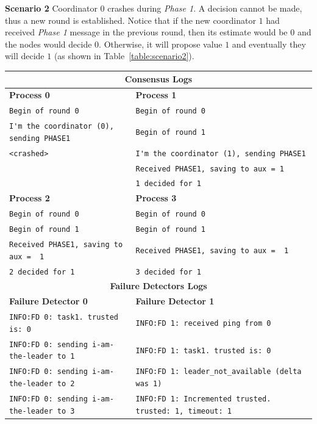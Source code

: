 \documentclass[a4paper]{article}
\begin{document}
\begin{compactitem}
\item \textbf{Scenario 2} Coordinator $0$ crashes during \emph{Phase 1}. A decision cannot be made, thus a new round is established. Notice that if the new coordinator $1$ had received \emph{Phase 1} message in the previous round, then its estimate would be $0$ and the nodes would decide $0$. Otherwise, it will propose value $1$ and eventually they will decide $1$ (as shown in Table~\ref{table:scenario2}).
	\begin{table}[H]
		\centering\scriptsize
        \begin{tabular}{ll}
		\toprule
        \multicolumn{2}{c}{\textbf{Consensus Logs}} \\
        \midrule
		\textbf{Process 0} & \textbf{Process 1} \\
		\midrule
        \verb|Begin of round 0| & \verb|Begin of round 0| \\
		\verb|I'm the coordinator (0), sending PHASE1| & \verb|Begin of round 1| \\
		\verb|<crashed>| & \verb|I'm the coordinator (1), sending PHASE1| \\
		& \verb|Received PHASE1, saving to aux = 1| \\
		& \verb|1 decided for 1| \\
        \midrule
		\textbf{Process 2} & \textbf{Process 3} \\
		\midrule
        \verb|Begin of round 0| & \verb|Begin of round 0| \\
		\verb|Begin of round 1| & \verb|Begin of round 1| \\
		\verb|Received PHASE1, saving to aux =  1| & \verb|Received PHASE1, saving to aux =  1| \\
		\verb|2 decided for 1| & \verb|3 decided for 1| \\
        \bottomrule\toprule
		\multicolumn{2}{c}{\textbf{Failure Detectors Logs}} \\
		\midrule
		\textbf{Failure Detector 0} & \textbf{Failure Detector 1} \\
		\midrule
		\verb|INFO:FD 0: task1. trusted is: 0| & \verb|INFO:FD 1: received ping from 0| \\
		\verb|INFO:FD 0: sending i-am-the-leader to 1| & \verb|INFO:FD 1: task1. trusted is: 0| \\
		\verb|INFO:FD 0: sending i-am-the-leader to 2| & \verb|INFO:FD 1: leader_not_available (delta was 1)| \\
		\verb|INFO:FD 0: sending i-am-the-leader to 3| & \verb|INFO:FD 1: Incremented trusted. trusted: 1, timeout: 1| \\

\end{tabular}
\end{table}
\end{compactitem}
\end{document}
